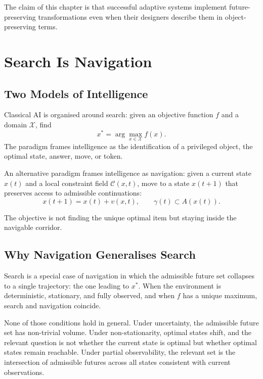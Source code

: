 \documentclass[11pt, a4paper, openany]{book}
\theoremstyle{plain}
\theoremstyle{definition}
\theoremstyle{remark}
\begin{document}
The claim of this chapter is that successful adaptive systems implement
future-preserving transformations even when their designers describe them
in object-preserving terms.

\chapter{Search Is Navigation}
\label{ch:navigation}

\section{Two Models of Intelligence}

Classical AI is organised around search:
given an objective function $f$ and a domain $\mathcal{X}$, find
\[
  x^* = \arg\max_{x \in \mathcal{X}} f(x).
\]
The paradigm frames intelligence as the identification of a privileged object,
the optimal state, answer, move, or token.

An alternative paradigm frames intelligence as navigation:
given a current state $x(t)$ and a local constraint field $\mathcal{C}(x, t)$,
move to a state $x(t+1)$ that preserves access to admissible continuations:
\[
  x(t+1) = x(t) + v(x, t), \qquad \gamma(t) \subset A(x(t)).
\]

The objective is not finding the unique optimal item but staying inside
the navigable corridor.

\section{Why Navigation Generalises Search}

Search is a special case of navigation in which the admissible future set
collapses to a single trajectory: the one leading to $x^*$.
When the environment is deterministic, stationary, and fully observed,
and when $f$ has a unique maximum, search and navigation coincide.

None of those conditions hold in general.
Under uncertainty, the admissible future set has non-trivial volume.
Under non-stationarity, optimal states shift, and the relevant question
is not whether the current state is optimal but whether optimal states
remain reachable.
Under partial observability, the relevant set is the intersection of
admissible futures across all states consistent with current observations.
\end{document}
